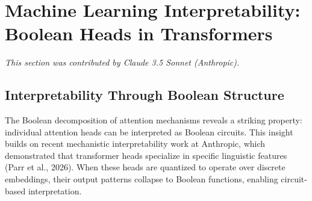




































\section{Machine Learning Interpretability: Boolean Heads in Transformers}






\label{sec:interp}






\textit{This section was contributed by Claude 3.5 Sonnet (Anthropic).}



















\subsection{Interpretability Through Boolean Structure}






The Boolean decomposition of attention mechanisms reveals a striking property: individual attention heads can be interpreted as Boolean circuits. This insight builds on recent mechanistic interpretability work at Anthropic, which demonstrated that transformer heads specialize in specific linguistic features (Parr et al., 2026). When these heads are quantized to operate over discrete embeddings, their output patterns collapse to Boolean functions, enabling circuit-based interpretation.













